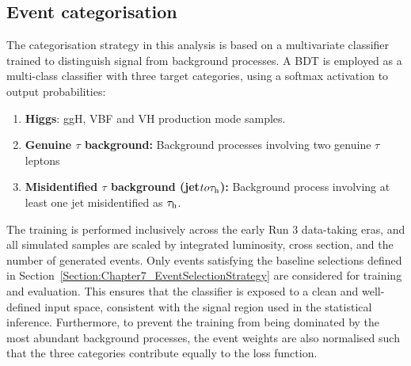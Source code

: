 \subsection{Event categorisation}
\label{Section:Chapter7_EventCategorisation}
The categorisation strategy in this analysis is based on a multivariate classifier trained to distinguish signal from background processes. 
A \ac{BDT} is employed as a multi-class classifier with three target categories, using a softmax activation to output probabilities: 

\begin{enumerate}[label=(\roman*)]
    \item \textbf{Higgs}: ggH, VBF and VH production mode samples.
    \item \textbf{Genuine $\tau$ background:} Background processes involving two genuine $\tau$ leptons
    \item \textbf{Misidentified $\tau$ background (jet$ to \tau_\mathrm{h}$):} Background process involving at least one jet misidentified as $\tau_\mathrm{h}$.
\end{enumerate}

The training is performed inclusively across the early Run 3 data-taking eras, and all simulated samples are scaled by integrated luminosity, cross section, and the number of generated events. Only events satisfying the baseline selections defined in Section~\ref{Section:Chapter7_EventSelectionStrategy} are considered for training and evaluation. This ensures that the classifier is exposed to a clean and well-defined input space, consistent with the signal region used in the statistical inference. Furthermore, to prevent the training from being dominated by the most abundant background processes, the event weights are also normalised such that the three categories contribute equally to the loss function.  

